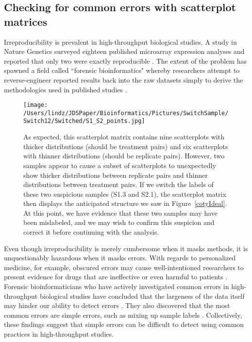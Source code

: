 \documentclass{bioinfo}
\begin{document}
\subsection{Checking for common errors with scatterplot matrices}

Irreproducibility is prevalent in high-throughput biological studies. A study in Nature Genetics surveyed eighteen published microarray expression analyses and reported that only two were exactly reproducible \citep{Ioannidis}. The extent of the problem has spawned a field called ``forensic bioinformatics" whereby researchers attempt to reverse-engineer reported results back into the raw datasets simply to derive the methodologies used in published studies \citep{Baggerly}.

\begin{figure}[!tpb]
\centerline{\texttt{[image: /Users/lindz/JDSPaper/Bioinformatics/Pictures/SwitchSample/Switch12/Switched/S1\_S2\_points.jpg]}}
\caption{As expected, this scatterplot matrix contains nine scatterplots with thicker distributions (should be treatment pairs) and six scatterplots with thinner distributions (should be replicate pairs). However, two samples appear to cause a subset of scatterplots to unexpectedly show thicker distributions between replicate pairs and thinner distributions between treatment pairs. If we switch the labels of these two suspicious samples (S1.3 and S2.1), the scatterplot matrix then displays the anticipated structure we saw in Figure~\ref{cotyIdeal}. At this point, we have evidence that these two samples may have been mislabeled, and we may wish to confirm this suspicion and correct it before continuing with the analysis.
\label{switchedScatMat}}
\end{figure}

Even though irreproducibility is merely cumbersome when it masks methods, it is unquestionably hazardous when it masks errors. With regards to personalized medicine, for example, obscured errors may cause well-intentioned researchers to present evidence for drugs that are ineffective or even harmful to patients \citep{Baggerly}. Forensic bioinformaticians who have actively investigated common errors in high-throughput biological studies have concluded that the largeness of the data itself may hinder our ability to detect errors \citep{Baggerly}. They also discovered that the most common errors are simple errors, such as mixing up sample labels \citep{Baggerly}. Collectively, these findings suggest that simple errors can be difficult to detect using common practices in high-throughput studies.
\end{document}
